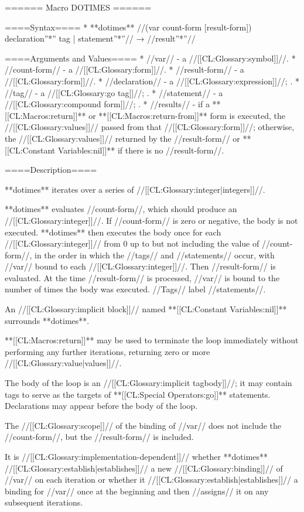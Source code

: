 ====== Macro DOTIMES ======

====Syntax====
  * **dotimes** //(var count-form [result-form]) declaration''*'' {tag | statement}''*''// → //result''*''//

====Arguments and Values====
  * //var// - a //[[CL:Glossary:symbol]]//.
  * //count-form// - a //[[CL:Glossary:form]]//.
  * //result-form// - a //[[CL:Glossary:form]]//.
  * //declaration// - a  //[[CL:Glossary:expression]]//; \noeval.
  * //tag// - a //[[CL:Glossary:go tag]]//; \noeval.
  * //statement// - a //[[CL:Glossary:compound form]]//; \evalspecial.
  * //results// - if a **[[CL:Macros:return]]** or **[[CL:Macros:return-from]]** form is executed, the //[[CL:Glossary:values]]// passed from that //[[CL:Glossary:form]]//; otherwise, the //[[CL:Glossary:values]]// returned by the //result-form// or **[[CL:Constant Variables:nil]]** if there is no //result-form//.

====Description====

**dotimes** iterates over a series of //[[CL:Glossary:integer|integers]]//.

**dotimes** evaluates //count-form//, which should produce an //[[CL:Glossary:integer]]//. If //count-form// is zero or negative, the body is not executed. **dotimes** then executes the body once for each //[[CL:Glossary:integer]]// from 0 up to but not including the value of //count-form//, in the order in which the //tags// and //statements// occur, with //var// bound to each //[[CL:Glossary:integer]]//. Then //result-form// is evaluated. At the time //result-form// is processed, //var// is bound to the number of times the body was executed. //Tags// label //statements//.

An //[[CL:Glossary:implicit block]]// named **[[CL:Constant Variables:nil]]** surrounds **dotimes**.

**[[CL:Macros:return]]** may be used to terminate the loop immediately without performing any further iterations, returning zero or more //[[CL:Glossary:value|values]]//.

The body of the loop is an //[[CL:Glossary:implicit tagbody]]//; it may contain tags to serve as the targets of **[[CL:Special Operators:go]]** statements. Declarations may appear before the body of the loop.

The //[[CL:Glossary:scope]]// of the binding of //var// does not include the //count-form//, but the //result-form// is included.

It is //[[CL:Glossary:implementation-dependent]]// whether **dotimes** //[[CL:Glossary:establish|establishes]]// a new //[[CL:Glossary:binding]]// of //var// on each iteration or whether it //[[CL:Glossary:establish|establishes]]// a binding for //var// once at the beginning and then //assigns// it on any subsequent iterations.


